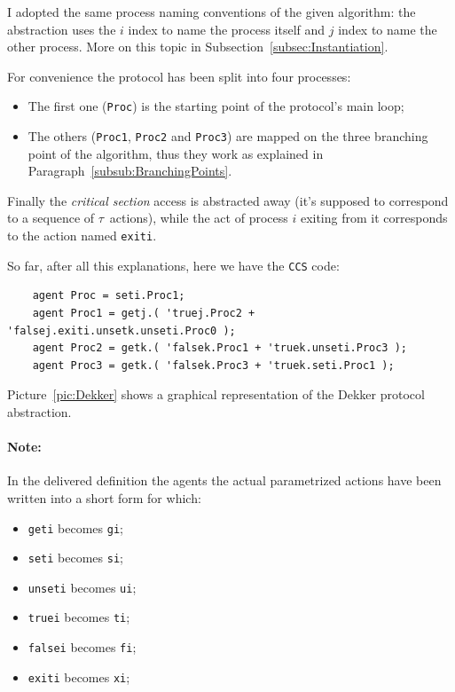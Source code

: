 \documentclass[10pt,a4paper]{article}
\newcommand{\Note}[1]{\paragraph{Note:}{#1}}
\newcommand{\CCS}{{\tt CCS}}
\newcommand{\CCSCode}[1]{{\tt #1}}
\newcommand{\Agent}[1]{{\tt {#1}}}
\begin{document}
            I adopted the same process naming conventions of the given
            algorithm: the abstraction uses the $i$ index to name the
            process itself and $j$ index to name the other process. More
            on this topic in Subsection~\ref{subsec:Instantiation}.

            For convenience the protocol has been split into four
            processes:
            \begin{itemize}
            \item   The first one (\Agent{Proc}) is the starting point of
                    the protocol's main loop;
            \item   The others (\Agent{Proc1}, \Agent{Proc2} and
                    \Agent{Proc3}) are mapped on the three branching point
                    of the algorithm, thus they work as explained in
                    Paragraph~\ref{subsub:BranchingPoints}.
            \end{itemize}

            Finally the \emph{critical section} access is abstracted away
            (it's supposed to correspond to a sequence of $\tau$~actions),
            while the act of process $i$ exiting from it corresponds to
            the action named \CCSCode{exiti}.

            So far, after all this explanations, here we have the \CCS{}
            code:
            \begin{verbatim}
    agent Proc = seti.Proc1;
    agent Proc1 = getj.( 'truej.Proc2 + 'falsej.exiti.unsetk.unseti.Proc0 );
    agent Proc2 = getk.( 'falsek.Proc1 + 'truek.unseti.Proc3 );
    agent Proc3 = getk.( 'falsek.Proc3 + 'truek.seti.Proc1 );
            \end{verbatim}

            Picture~\ref{pic:Dekker} shows a graphical representation of the
            Dekker protocol abstraction.

\newpage
            \Note{
                In the delivered definition the agents the actual
                parametrized actions have been written into a short form
                for which:
                \begin{multicols}{2}
                    \begin{itemize}
                    \item   \CCSCode{geti} becomes \CCSCode{gi};
                    \item   \CCSCode{seti} becomes \CCSCode{si};
                    \item   \CCSCode{unseti} becomes \CCSCode{ui};
                    \item   \CCSCode{truei} becomes \CCSCode{ti};
                    \item   \CCSCode{falsei} becomes \CCSCode{fi};
                    \item   \CCSCode{exiti} becomes \CCSCode{xi};
                    \end{itemize}
                \end{multicols}
            }
\end{document}
